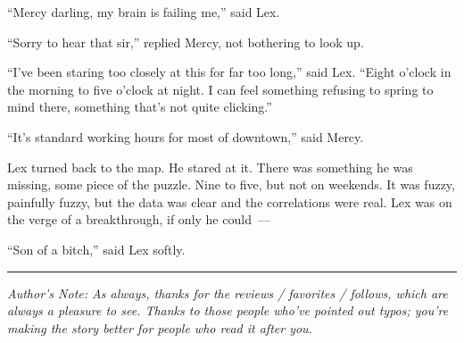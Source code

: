 ``Mercy darling, my brain is failing me,'' said Lex.

``Sorry to hear that sir,'' replied Mercy, not bothering to look up.

``I've been staring too closely at this for far too long,'' said Lex.
``Eight o'clock in the morning to five o'clock at night. I can feel
something refusing to spring to mind there, something that's not quite
clicking.''

``It's standard working hours for most of downtown,'' said Mercy.

Lex turned back to the map. He stared at it. There was something he was
missing, some piece of the puzzle. Nine to five, but not on weekends. It
was fuzzy, painfully fuzzy, but the data was clear and the correlations
were real. Lex was on the verge of a breakthrough, if only he could~---

``Son of a bitch,'' said Lex softly.

\begin{center}\rule{0.5\linewidth}{\linethickness}\end{center}

\emph{Author's Note: As always, thanks for the reviews / favorites /
follows, which are always a pleasure to see. Thanks to those people
who've pointed out typos; you're making the story better for people who
read it after you.}
